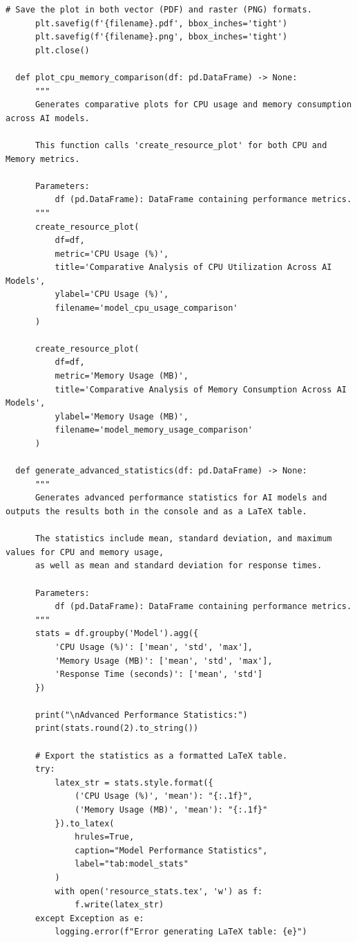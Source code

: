 \begin{lstlisting}[style=Python, caption={Python-quantitative-data-analysis}, captionpos=b]
      # Save the plot in both vector (PDF) and raster (PNG) formats.
      plt.savefig(f'{filename}.pdf', bbox_inches='tight')
      plt.savefig(f'{filename}.png', bbox_inches='tight')
      plt.close()
  
  def plot_cpu_memory_comparison(df: pd.DataFrame) -> None:
      """
      Generates comparative plots for CPU usage and memory consumption across AI models.
      
      This function calls 'create_resource_plot' for both CPU and Memory metrics.
      
      Parameters:
          df (pd.DataFrame): DataFrame containing performance metrics.
      """
      create_resource_plot(
          df=df,
          metric='CPU Usage (%)',
          title='Comparative Analysis of CPU Utilization Across AI Models',
          ylabel='CPU Usage (%)',
          filename='model_cpu_usage_comparison'
      )
      
      create_resource_plot(
          df=df,
          metric='Memory Usage (MB)',
          title='Comparative Analysis of Memory Consumption Across AI Models',
          ylabel='Memory Usage (MB)',
          filename='model_memory_usage_comparison'
      )
  
  def generate_advanced_statistics(df: pd.DataFrame) -> None:
      """
      Generates advanced performance statistics for AI models and outputs the results both in the console and as a LaTeX table.
      
      The statistics include mean, standard deviation, and maximum values for CPU and memory usage,
      as well as mean and standard deviation for response times.
      
      Parameters:
          df (pd.DataFrame): DataFrame containing performance metrics.
      """
      stats = df.groupby('Model').agg({
          'CPU Usage (%)': ['mean', 'std', 'max'],
          'Memory Usage (MB)': ['mean', 'std', 'max'],
          'Response Time (seconds)': ['mean', 'std']
      })
      
      print("\nAdvanced Performance Statistics:")
      print(stats.round(2).to_string())
      
      # Export the statistics as a formatted LaTeX table.
      try:
          latex_str = stats.style.format({
              ('CPU Usage (%)', 'mean'): "{:.1f}",
              ('Memory Usage (MB)', 'mean'): "{:.1f}"
          }).to_latex(
              hrules=True,
              caption="Model Performance Statistics",
              label="tab:model_stats"
          )
          with open('resource_stats.tex', 'w') as f:
              f.write(latex_str)
      except Exception as e:
          logging.error(f"Error generating LaTeX table: {e}")
  

\end{lstlisting}

